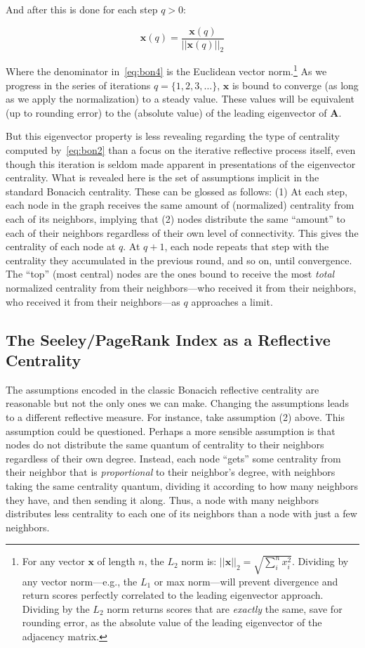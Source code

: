 \documentclass[a4paper,fleqn]{cas-sc}
\begin{document}
And after this is done for each step $q > 0$:

\begin{equation}
    \mathbf{x}(q) = \frac{\mathbf{x}(q)}{||\mathbf{x}(q)||_2}
    \label{eq:bon4}
\end{equation}

Where the denominator in~\ref{eq:bon4} is the Euclidean vector norm.\footnote{For any vector $\mathbf{x}$ of length $n$, the $L_2$ norm is: $||\mathbf{x}||_2 = \sqrt{\sum_i^n x_i^2}$. Dividing by any vector norm---e.g., the $L_1$ or max norm---will prevent divergence and return scores perfectly correlated to the leading eigenvector approach. Dividing by the $L_2$ norm returns scores that are \textit{exactly} the same, save for rounding error, as the absolute value of the leading eigenvector of the adjacency matrix.} As we progress in the series of iterations $q = \{1, 2, 3, \ldots\}$, $\mathbf{x}$ is bound to converge (as long as we apply the normalization) to a steady value. These values will be equivalent (up to rounding error) to the (absolute value) of the leading eigenvector of $\mathbf{A}$.

But this eigenvector property is less revealing regarding the type of centrality computed by~\ref{eq:bon2} than a focus on the iterative reflective process itself, even though this iteration is seldom made apparent in presentations of the eigenvector centrality. What is revealed here is the set of assumptions implicit in the standard Bonacich centrality. These can be glossed as follows: (1) At each step, each node in the graph receives the same amount of (normalized) centrality from each of its neighbors, implying that (2) nodes distribute the same ``amount'' to each of their neighbors regardless of their own level of connectivity. This gives the centrality of each node at $q$. At $q + 1$, each node repeats that step with the centrality they accumulated in the previous round, and so on, until convergence.  The ``top'' (most central) nodes are the ones bound to receive the most \textit{total} normalized centrality from their neighbors---who received it from their neighbors, who received it from their neighbors---as $q$ approaches a limit. 

\subsection{The Seeley/PageRank Index as a Reflective Centrality}
The assumptions encoded in the classic Bonacich reflective centrality are reasonable but not the only ones we can make. Changing the assumptions leads to a different reflective measure. For instance, take assumption (2) above. This assumption could be questioned. Perhaps a more sensible assumption is that nodes do not distribute the same quantum of centrality to their neighbors regardless of their own degree. Instead, each node ``gets'' some centrality from their neighbor that is \textit{proportional} to their neighbor's degree, with neighbors taking the same centrality quantum, dividing it according to how many neighbors they have, and then sending it along. Thus, a node with many neighbors distributes less centrality to each one of its neighbors than a node with just a few neighbors.
\end{document}
